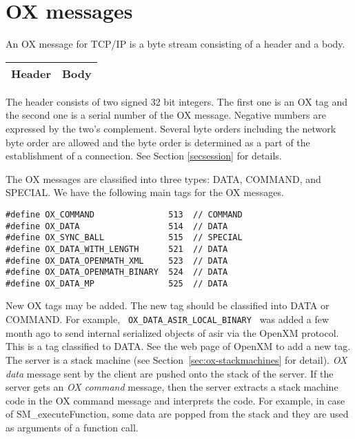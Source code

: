 
\section{OX messages}

An OX message for TCP/IP is a byte stream consisting of
a header and a body.
\begin{center}
\begin{tabular}{|c|c|}
\hline
Header	& \hspace{10mm} Body \hspace{10mm} \\
\hline
\end{tabular}
\end{center}
The header consists of two signed 32 bit integers.
The first one is an OX tag 
and the second one is a serial number of the OX message.
Negative numbers are expressed by the two's complement.
Several byte orders including the network byte order
are allowed and the byte order is determined as a part of
the establishment of a connection. See Section \ref{secsession} for details.

The OX messages are classified into three types:
DATA, COMMAND, and SPECIAL.
We have the following main tags for the OX messages.
\begin{verbatim}
#define	OX_COMMAND               513  // COMMAND
#define	OX_DATA	                 514  // DATA
#define OX_SYNC_BALL             515  // SPECIAL
#define OX_DATA_WITH_LENGTH      521  // DATA
#define OX_DATA_OPENMATH_XML     523  // DATA
#define OX_DATA_OPENMATH_BINARY  524  // DATA
#define OX_DATA_MP               525  // DATA
\end{verbatim}

New OX tags may be added.
The new tag should be classified into DATA or COMMAND.
For example, \verb+ OX_DATA_ASIR_LOCAL_BINARY +  was added a few month ago
to send internal serialized objects of asir via the OpenXM protocol.
This is a tag classified to DATA.
See the web page of OpenXM to add a new tag.
The server is a stack machine (see Section~\ref{sec:ox-stackmachines}
for detail).
{\it OX data} message sent by the client
are pushed onto the stack of the server. 
If the server gets an {\it OX command} message, then the server extracts
a stack machine code in the OX command message and interprets the code.
For example, in case of SM\_executeFunction, some data are popped from
the stack and they are used as arguments of a function call.

